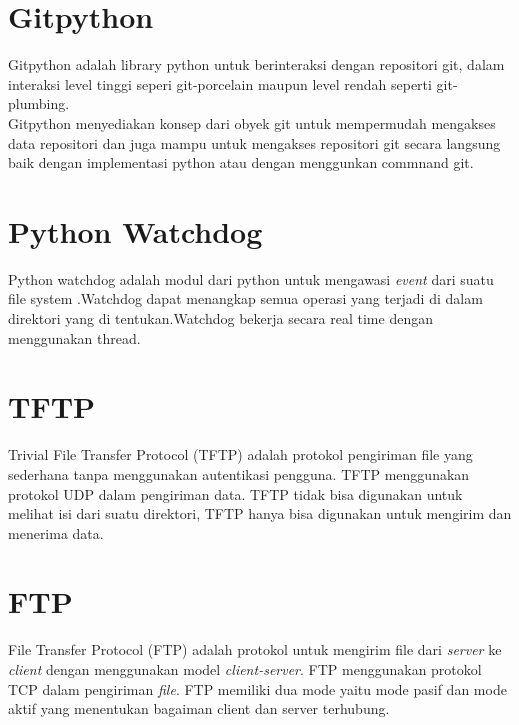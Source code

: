        	\section{Gitpython}
            Gitpython adalah library python untuk berinteraksi dengan repositori git, dalam interaksi level tinggi seperi git-porcelain maupun level rendah seperti git-plumbing.\\ 
            \indent Gitpython menyediakan konsep dari obyek git untuk mempermudah mengakses data repositori dan juga mampu untuk mengakses repositori git secara langsung baik dengan implementasi python atau dengan menggunkan commnand git.\cite{about_gitpython} \\
            
        \section{Python Watchdog}
            Python watchdog adalah modul dari python untuk mengawasi \textit{event} dari suatu file system .Watchdog dapat menangkap semua operasi yang terjadi di dalam direktori yang di tentukan.Watchdog bekerja secara real time dengan menggunakan thread.\cite{watchdog_python} \\     
        
        \section{TFTP}
        	Trivial File Transfer Protocol (TFTP) adalah protokol pengiriman file yang sederhana tanpa menggunakan autentikasi pengguna. TFTP menggunakan protokol UDP dalam pengiriman data. TFTP tidak bisa digunakan untuk melihat isi dari suatu direktori, TFTP hanya bisa digunakan untuk mengirim dan menerima data.\cite{tftp}\\
        	
        \section{FTP}
        	File Transfer Protocol (FTP) adalah protokol untuk mengirim file dari \textit{server} ke \textit{client} dengan menggunakan model \textit{client-server}. FTP menggunakan protokol TCP dalam pengiriman \textit{file}. FTP memiliki dua mode yaitu mode pasif dan mode aktif yang menentukan bagaiman client dan server terhubung.\cite{ftp}\\
        	
        
